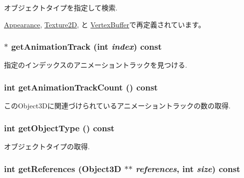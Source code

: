 オブジェクトタイプを指定して検索. 

\hyperlink{classm3g_1_1Appearance_4dadb21b568b0230fac106f15040138c}{Appearance}, \hyperlink{classm3g_1_1Texture2D_4dadb21b568b0230fac106f15040138c}{Texture2D}, と \hyperlink{classm3g_1_1VertexBuffer_4dadb21b568b0230fac106f15040138c}{VertexBuffer}で再定義されています。\hypertarget{classm3g_1_1Object3D_f0978f3f2efe3227ca613da3361424dd}{
\subsubsection[{getAnimationTrack}]{ $\ast$ getAnimationTrack (int {\em index}) const}}
\label{classm3g_1_1Object3D_f0978f3f2efe3227ca613da3361424dd}


指定のインデックスのアニメーショントラックを見つける. \hypertarget{classm3g_1_1Object3D_0926843b66090795972850376b8e4e6c}{
\subsubsection[{getAnimationTrackCount}]{\setlength{\rightskip}{0pt plus 5cm}int getAnimationTrackCount () const}}
\label{classm3g_1_1Object3D_0926843b66090795972850376b8e4e6c}


このObject3Dに関連づけられているアニメーショントラックの数の取得. \hypertarget{classm3g_1_1Object3D_06be1b37b707b5f227cba2308043f3df}{
\subsubsection[{getObjectType}]{\setlength{\rightskip}{0pt plus 5cm}int getObjectType () const}}
\label{classm3g_1_1Object3D_06be1b37b707b5f227cba2308043f3df}


オブジェクトタイプの取得. \hypertarget{classm3g_1_1Object3D_ddf91fbaaa866aa7aad5d530a69feba8}{
\subsubsection[{getReferences}]{\setlength{\rightskip}{0pt plus 5cm}int getReferences ({\bf Object3D} $\ast$$\ast$ {\em references}, \/  int {\em size}) const}}
\label{classm3g_1_1Object3D_ddf91fbaaa866aa7aad5d530a69feba8}


